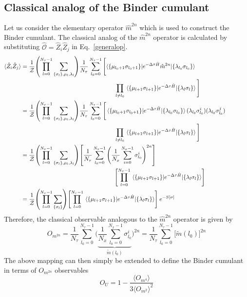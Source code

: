 \documentclass[../thesis_main.tex]{subfiles}
\begin{document}
\subsection{Classical analog of the Binder cumulant}
Let us consider the elementary operator $\hat{m}^{2n}$ which is used to construct the Binder cumulant. The classical analog of the $\hat{m}^{2n}$ operator is calculated by substituting $\hat{\mathcal{O}} =  \hat{Z}_i \hat{Z}_j$ in Eq.~\eqref{generalop}.
\begingroup
\allowdisplaybreaks
\begin{align}
    \langle {\hat{Z}_i \hat{Z}_j} \rangle &= \frac{1}{\mathcal{Z} }\qty(\prod_{l=0}^{N_\tau - 1} \sum_{\{\sigma_l \}, \mu_l, \lambda_l}) \frac{1}{N_\tau} \sum_{l_0 = 0}^{N_\tau - 1} \Bigg[\langle\{\mu_{l_0+1} \sigma _{l_0+1}\}|{e^{-\Delta \tau \hat{H}}{\hat{m}^{2n}}}|{\{\lambda_{l_0} \sigma _{l_0}\}} \rangle \qquad \qquad \nonumber\\
    &\qquad \qquad \qquad \qquad \qquad \qquad \qquad \qquad \prod_{l \neq l_0} \mel{\{\mu_{l+1} \sigma _{l+1}\}}{e^{-\Delta \tau \hat{H}}}{\{\lambda_{l} \sigma _{l}\}} \Bigg] \nonumber \\
    & =  \frac{1}{\mathcal{Z} }\qty(\prod_{l=0}^{N_\tau - 1} \sum_{\{\sigma_l \}, \mu_l, \lambda_l}) \frac{1}{N_\tau} \sum_{l_0 = 0}^{N_\tau - 1} \Bigg[\mel{\{\mu_{l_0+1} \sigma _{l_0+1}\}}{e^{-\Delta \tau \hat{H}}}{\{\lambda_{l_0} \sigma _{l_0}\}} (\lambda_{l_0} \sigma^i_{l_0})(\lambda_{l_0} \sigma^j_{l_0}) \qquad \qquad \nonumber \\ 
    & \qquad \qquad \qquad \qquad \qquad \qquad \qquad \qquad \prod_{l \neq l_0} \mel{\{\mu_{l+1} \sigma _{l+1}\}}{e^{-\Delta \tau \hat{H}}}{\{\lambda_{l} \sigma _{l}\}}\Bigg] \nonumber \\ 
    & = \frac{1}{\mathcal{Z} }\qty(\prod_{l=0}^{N_\tau - 1} \sum_{\{\sigma_l \}, \mu_l, \lambda_l}) \qty[\frac{1}{N_\tau} \sum_{l_0 = 0}^{N_\tau - 1}  \qty(\frac{1}{N_x} \sum_{i=0}^{N_x-1} \sigma^i_{l_0})^{2n}]  \nonumber  \\
    & \qquad \qquad \qquad \qquad \qquad \qquad \qquad \qquad\qty[\prod_{l = 0}^{N_\tau - 1} \mel{\{\mu_{l+1} \sigma _{l+1}\}}{e^{-\Delta \tau \hat{H}}}{\{\lambda_{l} \sigma _{l}\}}] \nonumber \\
    & = \frac{1}{\mathcal{Z}} \qty(\prod_{l=0}^{N_\tau - 1} \sum_{\{\sigma_l \}}) \qty[\prod_{l = 0}^{N_\tau - 1} \mel{\{\mu_{l+1} \sigma _{l+1}\}}{e^{-\Delta \tau \hat{H}}}{\{\lambda_{l} \sigma _{l}\}}] \: e^{-S[\sigma]}
\end{align}
\endgroup
Therefore, the classical observable analogous to the $\hat{m}^{2n}$ operator is given by
\begin{equation}
    O_{m^{2n}} = \frac{1}{N_\tau} \sum_{l_0 = 0}^{N_\tau - 1} \Bigg(\underbrace{\frac{1}{N_x} \sum_{l_0 = 0}^{N_x - 1} \sigma^i_{l_0}}_{\widetilde{m}(l_0)}\Bigg)^{2n} = \frac{1}{N_\tau} \sum_{l_0 = 0}^{N_\tau - 1} \big[\widetilde{m}(l_0)\big]^{2n} 
\end{equation}
The above mapping can then simply be extended to define the Binder cumulant in terms of $O_{m^{2n}}$ observables
\begin{equation}
    O_{U} = 1 - \frac{\langle O_{m^4} \rangle }{3 \langle O_{m^2} \rangle^2}
\end{equation}
\end{document}
